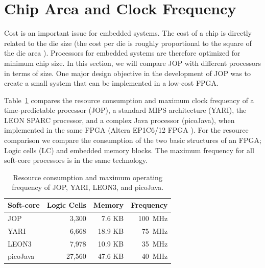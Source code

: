 \section{Chip Area and Clock Frequency}

Cost is an important issue for embedded systems. The cost of a chip
is directly related to the die size (the cost per die is roughly
proportional to the square of the die area \cite{Hennessy02}).
Processors for embedded systems are therefore optimized for minimum
chip size. In this section, we will compare JOP with different
processors in terms of size. One major design objective in the
development of JOP was to create a small system that can be
implemented in a low-cost FPGA.


Table~\ref{tab:soft-cores} compares the resource consumption and
maximum clock frequency of a time-predictable processor (JOP), a
standard MIPS architecture (YARI), the LEON SPARC processor, and a
complex Java processor (picoJava), when implemented in the same FPGA
(Altera EP1C6/12 FPGA \cite{AltCyc}). For the resource comparison we
compare the consumption of the two basic structures of an FPGA; Logic
cells (LC) and embedded memory blocks. The maximum frequency for all
soft-core processors is in the same technology.


\begin{table}
  \begin{center}
    \begin{tabular}[t]{lrrr}
        \toprule
      Soft-core    & Logic Cells & Memory  & Frequency \\
        \midrule
      JOP          & 3,300       &  7.6 KB & 100~MHz    \\
      YARI         & 6,668       & 18.9 KB & 75~MHz     \\
      LEON3        & 7,978       & 10.9 KB & 35~MHz \\
      picoJava     & 27,560      & 47.6 KB & 40~MHz     \\
        \bottomrule
    \end{tabular}
  \end{center}
    \caption{Resource consumption and maximum operating frequency of JOP, YARI, LEON3, and picoJava.}
    \label{tab:soft-cores}
\end{table}


